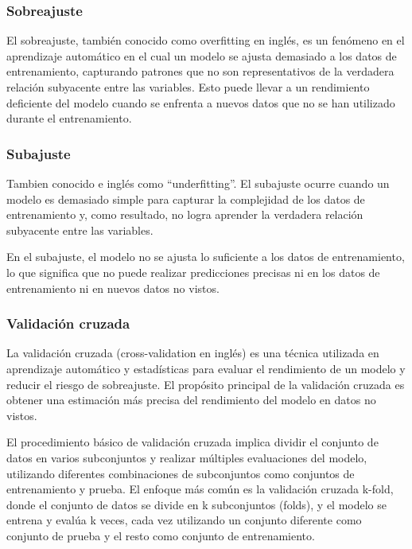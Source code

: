 \documentclass[
]{article}
\begin{document}
\hypertarget{sobreajuste}{%
\subsubsection{Sobreajuste}\label{sobreajuste}}

El sobreajuste, también conocido como overfitting en inglés, es un
fenómeno en el aprendizaje automático en el cual un modelo se ajusta
demasiado a los datos de entrenamiento, capturando patrones que no son
representativos de la verdadera relación subyacente entre las variables.
Esto puede llevar a un rendimiento deficiente del modelo cuando se
enfrenta a nuevos datos que no se han utilizado durante el
entrenamiento.

\hypertarget{subajuste}{%
\subsubsection{Subajuste}\label{subajuste}}

Tambien conocido e inglés como ``underfitting''. El subajuste ocurre
cuando un modelo es demasiado simple para capturar la complejidad de los
datos de entrenamiento y, como resultado, no logra aprender la verdadera
relación subyacente entre las variables.

En el subajuste, el modelo no se ajusta lo suficiente a los datos de
entrenamiento, lo que significa que no puede realizar predicciones
precisas ni en los datos de entrenamiento ni en nuevos datos no vistos.

\hypertarget{validaciuxf3n-cruzada}{%
\subsubsection{Validación cruzada}\label{validaciuxf3n-cruzada}}

La validación cruzada (cross-validation en inglés) es una técnica
utilizada en aprendizaje automático y estadísticas para evaluar el
rendimiento de un modelo y reducir el riesgo de sobreajuste. El
propósito principal de la validación cruzada es obtener una estimación
más precisa del rendimiento del modelo en datos no vistos.

El procedimiento básico de validación cruzada implica dividir el
conjunto de datos en varios subconjuntos y realizar múltiples
evaluaciones del modelo, utilizando diferentes combinaciones de
subconjuntos como conjuntos de entrenamiento y prueba. El enfoque más
común es la validación cruzada k-fold, donde el conjunto de datos se
divide en k subconjuntos (folds), y el modelo se entrena y evalúa k
veces, cada vez utilizando un conjunto diferente como conjunto de prueba
y el resto como conjunto de entrenamiento.
\end{document}

